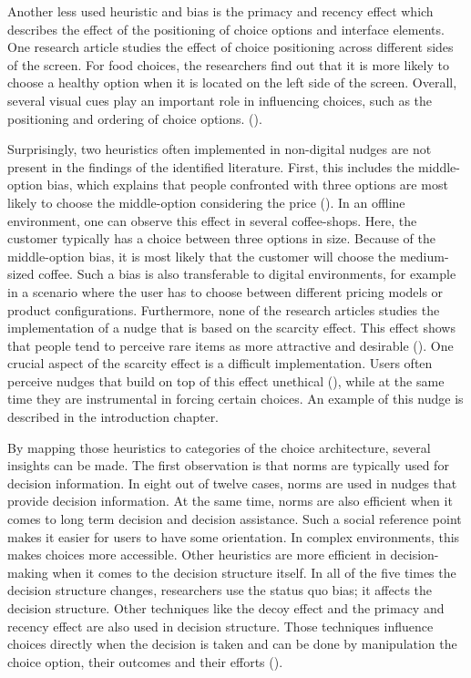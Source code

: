 Another less used heuristic and bias is the primacy and recency effect which describes the effect of the positioning of choice options and interface elements. One research article studies the effect of choice positioning across different sides of the screen. For food choices, the researchers find out that it is more likely to choose a healthy option when it is located on the left side of the screen. Overall, several visual cues play an important role in influencing choices, such as the positioning and ordering of choice options. (\cite{romero_healthy-left_2016}).

Surprisingly, two heuristics often implemented in non-digital nudges are not present in the findings of the identified literature. First, this includes the middle-option bias, which explains that people confronted with three options are most likely to choose the middle-option considering the price (\cite{schneider_digital_2018}). In an offline environment, one can observe this effect in several coffee-shops. Here, the customer typically has a choice between three options in size. Because of the middle-option bias, it is most likely that the customer will choose the medium-sized coffee. Such a bias is also transferable to digital environments, for example in a scenario where the user has to choose between different pricing models or product configurations. 
Furthermore, none of the research articles studies the implementation of a nudge that is based on the scarcity effect. This effect shows that people tend to perceive rare items as more attractive and desirable (\cite{gergen_search_1980}). One crucial aspect of the scarcity effect is a difficult implementation. Users often perceive nudges that build on top of this effect unethical (\cite{sunstein_nudging_2015}), while at the same time they are instrumental in forcing certain choices. An example of this nudge is described in the introduction chapter.

By mapping those heuristics to categories of the choice architecture, several insights can be made. The first observation is that norms are typically used for decision information. In eight out of twelve cases, norms are used in nudges that provide decision information. At the same time, norms are also efficient when it comes to long term decision and decision assistance. Such a social reference point makes it easier for users to have some orientation. In complex environments, this makes choices more accessible. 
Other heuristics are more efficient in decision-making when it comes to the decision structure itself. In all of the five times the decision structure changes, researchers use the status quo bias; it affects the decision structure.
Other techniques like the decoy effect and the primacy and recency effect are also used in decision structure. Those techniques influence choices directly when the decision is taken and can be done by manipulation the choice option, their outcomes and their efforts (\cite{munscher_review_2016}).


